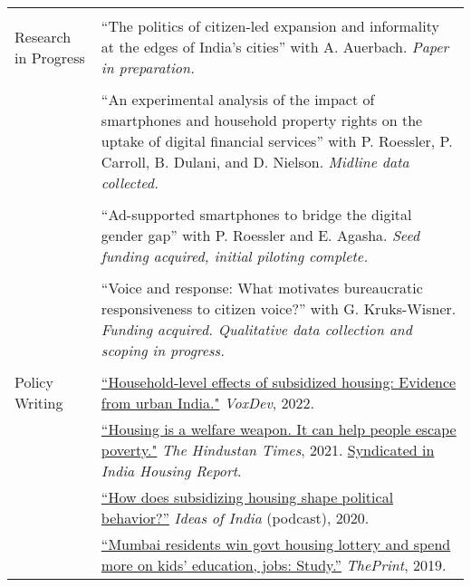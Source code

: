 \documentclass[letterpaper, 10pt]{article}
\begin{document}
\begin{longtable}{p{1.5in}p{5in}}
\\

& \\


Research in Progress 
& ``The politics of citizen-led expansion and informality at the edges of India’s cities'' with A. Auerbach. \textit{Paper in preparation.}\\
& \\
&``An experimental analysis of the impact of smartphones and household property rights on the uptake of digital financial services'' with P. Roessler, P. Carroll, B. Dulani, and D. Nielson. \textit{Midline data collected.}\\
& \\
&``Ad-supported smartphones to bridge the digital gender gap'' with P. Roessler and E. Agasha. \textit{Seed funding acquired, initial piloting complete.} \\
& \\
&``Voice and response: What motivates bureaucratic responsiveness to citizen voice?'' with G. Kruks-Wisner. \textit{Funding acquired. Qualitative data collection and scoping in progress.}\\


& \\

Policy Writing & \href{https://voxdev.org/topic/infrastructure-urbanisation/household-level-effects-subsidised-housing-evidence-urban-india?utm_source=dlvr.it&utm_medium=twitter}{``Household-level effects of subsidized housing: Evidence from urban India."} \textit{VoxDev}, 2022.\\
& \href{https://www.hindustantimes.com/opinion/housing-is-a-welfare-weapon-it-can-help-people-escape-poverty-101629993983576.html}{``Housing is a welfare weapon. It can help people escape poverty."} \textit{The Hindustan Times}, 2021. \href{https://indiahousingreport.in/outputs/opinion/housing-is-a-welfare-weapon-it-can-help-people-escape-poverty/}{Syndicated in} \textit{India Housing Report}. \\ 

&   \href{https://www.discoursemagazine.com/politics/2020/12/24/ideas-of-india-how-does-subsidizing-housing-prices-shape-political-behavior}{``How does subsidizing housing shape political behavior?''} \textit{Ideas of India} (podcast), 2020.\\


& \href{https://theprint.in/opinion/mumbai-residents-win-govt-housing-lottery-and-spend-more-on-kids-education-jobs-study/290485/}{``Mumbai residents win govt housing lottery and spend more on kids' education, jobs: Study.''} \textit{ThePrint}, 2019. \\


\end{longtable}
\end{document}
